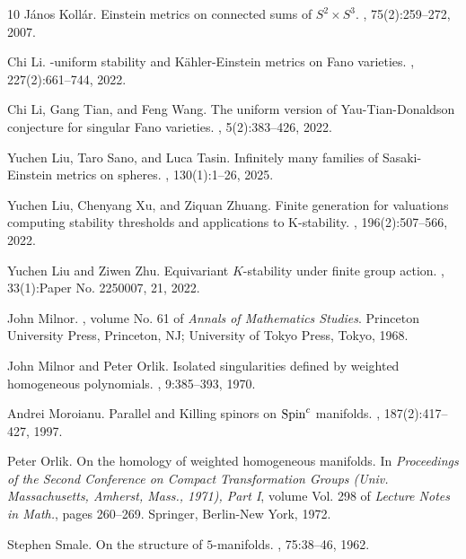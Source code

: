 \documentclass[12pt]{amsart}
\theoremstyle{definition}
\theoremstyle{remark}
\begin{document}
\begin{thebibliography}{10}
J\'anos Koll\'ar.
\newblock Einstein metrics on connected sums of {$S^2\times S^3$}.
, 75(2):259--272, 2007.

Chi Li.
-uniform stability and {K}\"ahler-{E}instein metrics on {F}ano
  varieties.
, 227(2):661--744, 2022.

Chi Li, Gang Tian, and Feng Wang.
\newblock The uniform version of {Y}au-{T}ian-{D}onaldson conjecture for
  singular {F}ano varieties.
, 5(2):383--426, 2022.

Yuchen Liu, Taro Sano, and Luca Tasin.
\newblock Infinitely many families of {S}asaki-{E}instein metrics on spheres.
, 130(1):1--26, 2025.

Yuchen Liu, Chenyang Xu, and Ziquan Zhuang.
\newblock Finite generation for valuations computing stability thresholds and
  applications to {K}-stability.
, 196(2):507--566, 2022.

Yuchen Liu and Ziwen Zhu.
\newblock Equivariant {$K$}-stability under finite group action.
, 33(1):Paper No. 2250007, 21, 2022.

John Milnor.
, volume No. 61 of {\em
  Annals of Mathematics Studies}.
\newblock Princeton University Press, Princeton, NJ; University of Tokyo Press,
  Tokyo, 1968.

John Milnor and Peter Orlik.
\newblock Isolated singularities defined by weighted homogeneous polynomials.
, 9:385--393, 1970.

Andrei Moroianu.
\newblock Parallel and {K}illing spinors on {${\rm Spin}^c$} manifolds.
, 187(2):417--427, 1997.

Peter Orlik.
\newblock On the homology of weighted homogeneous manifolds.
\newblock In {\em Proceedings of the {S}econd {C}onference on {C}ompact
  {T}ransformation {G}roups ({U}niv. {M}assachusetts, {A}mherst, {M}ass.,
  1971), {P}art {I}}, volume Vol. 298 of {\em Lecture Notes in Math.}, pages
  260--269. Springer, Berlin-New York, 1972.

Stephen Smale.
\newblock On the structure of {$5$}-manifolds.
, 75:38--46, 1962.


\end{thebibliography}
\end{document}
